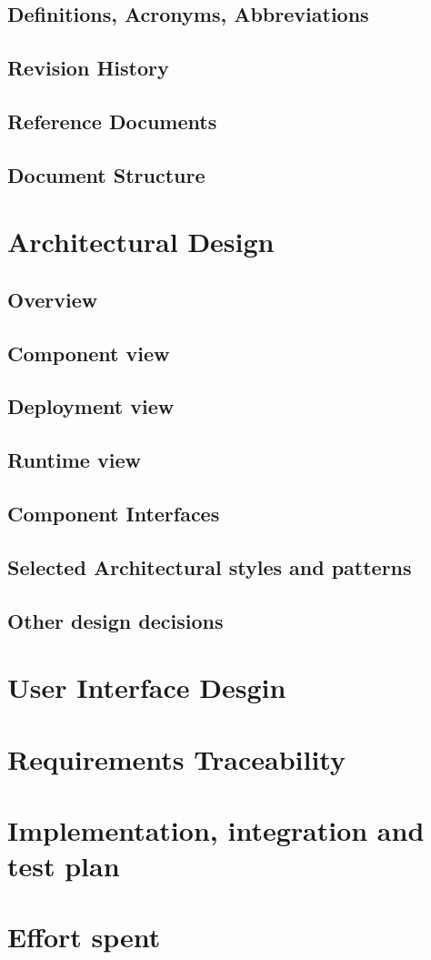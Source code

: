 \documentclass[10pt]{article} %
\begin{document}
\subsection{Definitions, Acronyms, Abbreviations}
\subsection{Revision History}
\subsection{Reference Documents}
\subsection{Document Structure}

\section{Architectural Design}
\subsection{Overview}
\subsection{Component view}
\subsection{Deployment view}
\subsection{Runtime view}
\subsection{Component Interfaces}
\subsection{Selected Architectural styles and patterns}
\subsection{Other design decisions}

\section{User Interface Desgin}

\section{Requirements Traceability}

\section{Implementation, integration and test plan}

\section{Effort spent}


\end{document}
